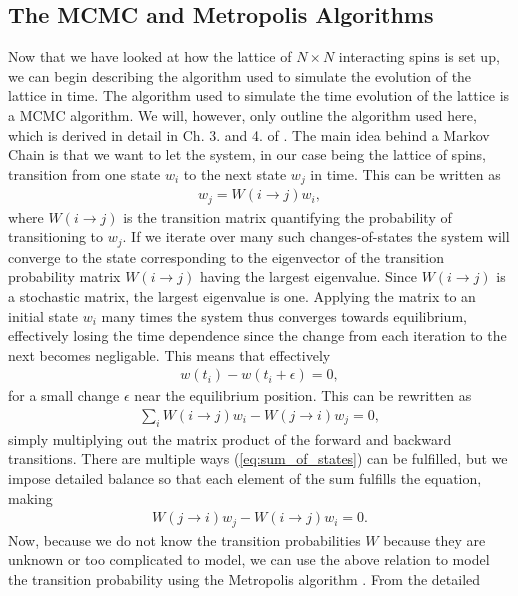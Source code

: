 \documentclass[twocolumn]{aastex62}
\begin{document}
\subsection{The MCMC and Metropolis Algorithms}
Now that we have looked at how the lattice of $N\times N$ interacting spins is set up, we
can begin describing the algorithm used to simulate the evolution of the lattice
in time. The algorithm used to simulate the time evolution of the lattice is a
MCMC algorithm. We will, however, only outline the algorithm
used here, which is derived in detail in Ch. 3. and 4. of \cite{newman:2019}.
The main idea behind a Markov Chain is that we want to let the system, in our
case being the lattice of spins, transition from one state $w_i$ to the next state $w_j$
in time. This can be written as
\begin{align}
	w_j = W(i\to j)w_i,
\end{align}
where $W(i\to j)$ is the transition matrix quantifying the probability of
transitioning to $w_j$. If we iterate over many such changes-of-states
the system will converge to the state corresponding to the eigenvector of the
transition probability matrix $W(i\to j)$ having the largest eigenvalue. Since
$W(i\to j)$ is a stochastic matrix, the largest eigenvalue is one. Applying the
matrix to an initial state $w_i$ many times the system thus converges towards equilibrium, effectively losing the time dependence since the change from each
iteration to the next becomes negligable. This means that effectively
\begin{align}
	w(t_i) - w(t_i + \epsilon) = 0,
\end{align}
for a small change $\epsilon$ near the equilibrium position. This can be
rewritten as
\begin{align}
	\sum_i W(i \to j)w_i - W(j \to i)w_j = 0,
	\label{eq:sum_of_states}
\end{align}
simply multiplying out the matrix product of the forward and backward
transitions. There are multiple ways (\ref{eq:sum_of_states}) can be fulfilled,
but we impose detailed balance \citep[Ch. 3. and 4.]{newman:2019} so that each element of the sum
fulfills the equation, making
\begin{align}
	W(j \to i)w_j - W(i \to j)w_i = 0.
\end{align}
Now, because we do not know the transition probabilities $W$ because they are
unknown or too complicated to model, we can use the above relation to model the transition
probability using the Metropolis algorithm \citep[Ch. 3. and 4.]{newman:2019}. From the detailed
\end{document}
